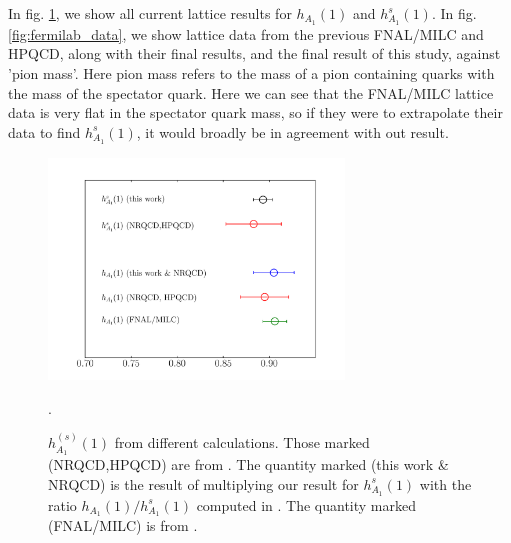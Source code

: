 In fig. \ref{fig:comparison}, we show all current lattice results for $h_{A_1}(1)$ and $h_{A_1}^s(1)$. In fig. \ref{fig:fermilab_data}, we show lattice data from the previous FNAL/MILC and HPQCD, along with their final results, and the final result of this study, against 'pion mass'. Here pion mass refers to the mass of a pion containing quarks with the mass of the spectator quark. Here we can see that the FNAL/MILC lattice data is very flat in the spectator quark mass, so if they were to extrapolate their data to find $h^s_{A_1}(1)$, it would broadly be in agreement with out result.

\begin{figure}[htb!]
  \begin{center}
  \hspace{-20pt}
  \includegraphics[width=0.7\textwidth]{images/BsDsstar/comparisons.pdf}
  \caption{ $h_{A_1}^{(s)}(1)$ from different calculations. Those marked (NRQCD,HPQCD) are from \cite{Harrison:2017fmw}. The quantity marked (this work \& NRQCD) is the result of multiplying our result for $h^s_{A_1}(1)$ with the ratio $h_{A_1}(1)/h^s_{A_1}(1)$ computed in \cite{Harrison:2017fmw}. The quantity marked (FNAL/MILC) is from \cite{Bailey:2014tva}. \label{fig:comparison}}.
  \end{center}
\end{figure}

